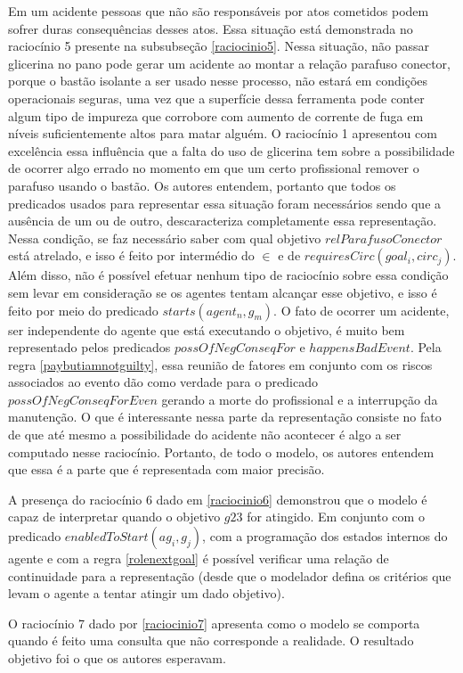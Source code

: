 Em um acidente pessoas que não são responsáveis por atos cometidos podem sofrer duras consequências desses atos. Essa situação está demonstrada no raciocínio 5 presente na subsubseção \ref{raciocinio5}. Nessa situação, não passar glicerina no pano pode gerar um acidente ao montar a relação parafuso conector, porque o bastão isolante a ser usado nesse  processo, não estará em condições operacionais seguras, uma vez que a superfície dessa ferramenta pode conter algum tipo de impureza que corrobore com aumento de corrente de fuga em níveis suficientemente altos para matar alguém. O raciocínio 1 apresentou com excelência essa influência que a falta do uso de glicerina tem sobre a possibilidade de ocorrer algo errado no momento em que um certo profissional remover o parafuso usando o bastão. Os autores entendem, portanto que todos os predicados usados para representar essa situação foram necessários sendo que a ausência de um ou de outro, descaracteriza completamente essa representação. Nessa condição, se faz necessário saber com qual objetivo $relParafusoConector$ está atrelado, e isso é feito por intermédio do $\in$ e de $requiresCirc(goal_i,circ_j)$. Além disso, não é possível efetuar nenhum tipo de raciocínio sobre essa condição sem levar em consideração se os agentes tentam alcançar esse objetivo, e isso é feito por meio do predicado $starts(agent_n,g_m)$. O fato de ocorrer um acidente, ser independente do agente que está executando o objetivo, é muito bem representado pelos predicados $possOfNegConseqFor$ e $happensBadEvent$. Pela regra \ref{paybutiamnotguilty}, essa reunião de fatores em conjunto com os riscos associados ao evento dão como verdade para o predicado $possOfNegConseqForEven$ gerando a morte do profissional e a interrupção da manutenção. O que é interessante nessa parte da representação consiste no fato de que até mesmo a possibilidade do acidente não acontecer é algo a ser computado nesse raciocínio. Portanto, de todo o modelo, os autores entendem que essa é a parte que é representada com maior precisão. 

A presença do raciocínio 6 dado em \ref{raciocinio6} demonstrou que o modelo é capaz de interpretar quando o objetivo $g23$ for atingido. Em conjunto com o predicado $enabledToStart(ag_i,g_j)$, com a programação dos estados internos do agente e com a regra \ref{rolenextgoal} é possível verificar uma relação de continuidade para a representação (desde que o modelador defina os critérios que levam o agente a tentar atingir um dado objetivo). 

O raciocínio 7 dado por \ref{raciocinio7} apresenta como o modelo se comporta quando é feito uma consulta que não corresponde a realidade. O resultado objetivo foi o que os autores esperavam. 

